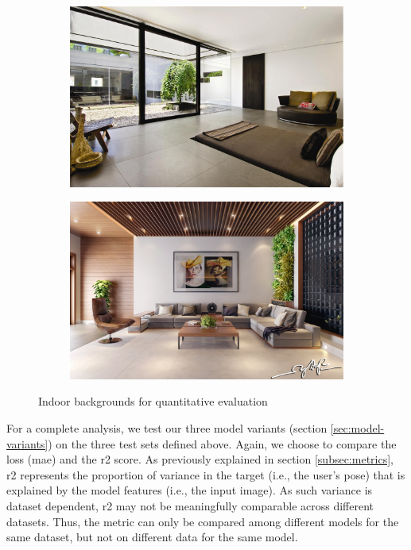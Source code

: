 \begin{figure}[!h]
	\begin{center}
		\begin{subfigure}[h]{0.49\textwidth}
			\centering
			\includegraphics[width=1\textwidth]{"contents/images/06-indoor1"}
		\end{subfigure}
		\hfill
		\begin{subfigure}[h]{0.49\textwidth}
			\centering
			\includegraphics[width=1\textwidth]{"contents/images/06-indoor2"}
		\end{subfigure}
	\end{center}
	\vspace{-0.5cm}
	\caption[Indoor backgrounds for quantitative evaluation]{Indoor backgrounds for quantitative evaluation}
	\label{fig:test-indoor}
\end{figure}

For a complete analysis, we test our three model variants (section \ref{sec:model-variants}) on the three test sets defined above. Again, we choose to compare the loss (\gls{mae}) and the \gls{r2} score. As previously explained in section \ref{subsec:metrics}, \gls{r2} represents the proportion of variance in the target (i.e., the user's pose) that is explained by the model features (i.e., the input image). As such variance is dataset dependent, \gls{r2} may not be meaningfully comparable across different datasets. Thus, the metric can only be compared among different models for the same dataset, but not on different data for the same model.

